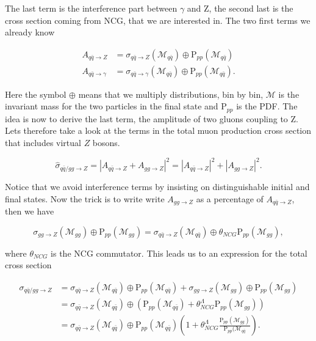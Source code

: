 The last term is the interference part between $\gamma$ and Z, the second last is the cross section coming from NCG, that we are interested in. The two first terms we already know

\begin{align}
A_{q \bar q \rightarrow Z} &= \sigma_{q \bar q \rightarrow Z} (\mathcal{M}_{q \bar q}) \oplus \textrm{P}_{pp}(\mathcal{M}_{q \bar q}) \nonumber \\ 
A_{q \bar q \rightarrow \gamma} &= \sigma_{q \bar q \rightarrow  \gamma}( \mathcal{M}_{q \bar q}) \oplus \textrm{P}_{pp}(\mathcal{M}_{q \bar q}).
\end{align}

Here the symbol $\oplus$ means that we multiply distributions, bin by bin, $\mathcal{M}$ is the invariant mass for the two particles in the final state and P$_{pp}$ is the PDF. The idea is now to derive the last term, the amplitude of two gluons coupling to Z. Lets therefore take a look at the terms in the total muon production cross section that includes virtual $Z$ bosons.

\begin{equation}
\hat \sigma_{q \bar q/gg \rightarrow Z} = |A_{q \bar q \rightarrow Z} + A_{gg \rightarrow Z}|^{2}=|A_{q \bar q \rightarrow Z}|^{2}+|A_{gg \rightarrow Z}|^{2}.
\end{equation}

Notice that we avoid interference terms by insisting on distinguishable initial and final states. Now the trick is to write write $A_{gg \rightarrow Z}$ as a percentage of $A_{q \bar q \rightarrow Z}$, then we have

\begin{equation}
\sigma_{gg\rightarrow Z} (\mathcal{M}_{gg}) \oplus \textrm{P}_{pp}(\mathcal{M}_{gg})=\sigma_{q \bar q\rightarrow Z}(\mathcal{M}_{q \bar q}) \oplus \theta_{NCG}\textrm{P}_{pp}(\mathcal{M}_{gg}),
\end{equation}

where $\theta_{NCG}$ is the NCG commutator. This leads us to an expression for the total cross section

\begin{align}
\sigma_{q \bar q/gg \rightarrow Z} &= \sigma_{q \bar q \rightarrow Z} (\mathcal{M}_{q \bar q}) \oplus \textrm{P}_{pp}(\mathcal{M}_{q \bar q})+ \sigma_{gg\rightarrow Z} (\mathcal{M}_{gg}) \oplus \textrm{P}_{pp}(\mathcal{M}_{gg})\nonumber \\ 
&= \sigma_{q \bar q\rightarrow Z}(\mathcal{M}_{q \bar q}) \oplus (\textrm{P}_{pp}(\mathcal{M}_{q \bar q})+\theta_{NCG}^{\Lambda}\textrm{P}_{pp}(\mathcal{M}_{gg}))\nonumber \\ 
&= \sigma_{q \bar q\rightarrow Z}(\mathcal{M}_{q \bar q}) \oplus \textrm{P}_{pp}(\mathcal{M}_{q \bar q}) \left ( 1+\theta_{NCG}^{\Lambda}\frac{\textrm{P}_{pp}(\mathcal{M}_{gg})}{\textrm{P}_{pp}(\mathcal{M}_{q \bar q}} \right ).
\end{align}

